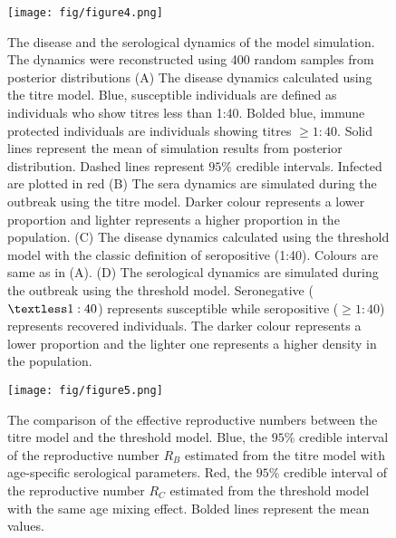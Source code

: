 \documentclass{article}
\begin{document}
\clearpage
\begin{figure}[h!]
      \texttt{[image: fig/figure4.png]}
      \caption{The disease and the serological dynamics of the model simulation. The dynamics were reconstructed using 400 random samples from posterior distributions (A) The disease dynamics calculated using the titre model. Blue, susceptible individuals are defined as individuals who show titres less than 1:40. Bolded blue, immune protected individuals are individuals showing titres $\geq1:40$. Solid lines represent the mean of simulation results from posterior distribution. Dashed lines represent $95\%$ credible intervals. Infected are plotted in red (B) The sera dynamics are simulated during the outbreak using the titre model. Darker colour represents a lower proportion and lighter represents a higher proportion in the population. (C) The disease dynamics calculated using the threshold model with the classic definition of seropositive (1:40). Colours are same as in (A). (D) The serological dynamics are simulated during the outbreak using the threshold model. Seronegative ($\textless 1:40$) represents susceptible while seropositive ($\geq1:40$) represents recovered individuals. The darker colour represents a lower proportion and the lighter one represents a higher density in the population.
}
\end{figure}

\begin{figure}[h!]
      \texttt{[image: fig/figure5.png]}
      \caption{The comparison of the effective reproductive numbers between the titre model and the threshold model. Blue, the $95\%$ credible interval of the reproductive number $R_{B}$ estimated from the titre model with age-specific serological parameters. Red, the $95\%$ credible interval of the reproductive number $R_{C}$ estimated from the threshold model with the same age mixing effect. Bolded lines represent the mean values.}
\end{figure}
\end{document}
